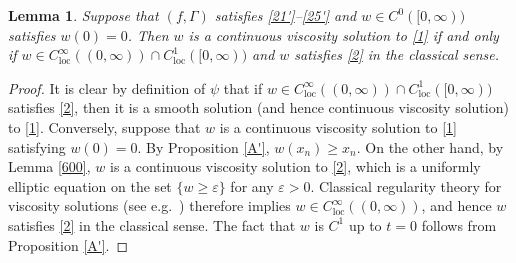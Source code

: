 \documentclass[12pt]{article}
\numberwithin{equation}{section}
\theoremstyle{plain}
\newtheorem{lem}[thm]{Lemma}
\theoremstyle{definition}
\newcommand{\ep}{\varepsilon}
\begin{document}
\begin{lem}\label{p0}
	Suppose that $(f,\Gamma)$ satisfies \eqref{21'}--\eqref{25'} and $w\in C^0([0,\infty))$ satisfies $w(0) = 0$. Then $w$ is a continuous viscosity solution to \eqref{1} if and only if $w\in C^\infty_{\operatorname{loc}}((0,\infty))\cap C^1_{\operatorname{loc}}([0,\infty))$ and $w$ satisfies \eqref{2} in the classical sense. 
\end{lem}
\begin{proof}
	It is clear by definition of $\psi$ that if $w\in C^\infty_{\operatorname{loc}}((0,\infty))\cap C^1_{\operatorname{loc}}([0,\infty))$ satisfies \eqref{2}, then it is a smooth solution (and hence continuous viscosity solution) to \eqref{1}. Conversely, suppose that $w$ is a continuous viscosity solution to \eqref{1} satisfying $w(0) = 0$. By Proposition \ref{A'}, $w(x_n) \geq x_n$. On the other hand, by Lemma \ref{600}, $w$ is a continuous viscosity solution to \eqref{2}, which is a uniformly elliptic equation on the set $\{w \geq \ep\}$ for any $\ep>0$. Classical regularity theory for viscosity solutions (see e.g.~\cite{CC95}) therefore implies $w\in C^\infty_{\operatorname{loc}}((0,\infty))$, and hence $w$ satisfies \eqref{2} in the classical sense. The fact that $w$ is $C^1$ up to $t=0$ follows from Proposition \ref{A'}. 
\end{proof}
\end{document}
